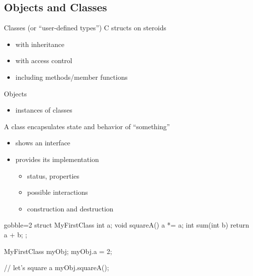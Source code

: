 \subsection[OO]{Objects and Classes}

\begin{frame}[fragile]
  \begin{block}{Classes (or ``user-defined types'')}
    C structs on steroids
    \begin{itemize}
    \item with inheritance
    \item with access control
    \item including methods/member functions
    \end{itemize}
  \end{block}
  \begin{block}{Objects}
    \begin{itemize}
    \item instances of classes
    \end{itemize}
  \end{block}
  \begin{block}{A class encapsulates state and behavior of ``something''}
    \begin{itemize}
    \item shows an interface
    \item provides its implementation
      \begin{itemize}
      \item status, properties
      \item possible interactions
      \item construction and destruction
      \end{itemize}
    \end{itemize}
  \end{block}
\end{frame}


\begin{frame}[fragile]
  \begin{multicols}{2}
    \begin{cppcode*}{gobble=2}
      struct MyFirstClass {
        int a;
        void squareA() {
          a *= a;
        }
        int sum(int b) {
          return a + b;
        }
      };

      MyFirstClass myObj;
      myObj.a = 2;

      // let's square a
      myObj.squareA();
    \end{cppcode*}
    \columnbreak
    \center
    \null \vfill
    \vfill \null
  \end{multicols}
\end{frame}

